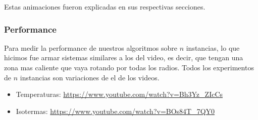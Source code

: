 Estas animaciones fueron explicadas en sus respectivas secciones. 

\subsubsection{Performance}

Para medir la performance de nuestros algoritmos sobre $n$ instancias, lo que hicimos fue armar sistemas similares a los del video, es decir, que tengan una zona mas caliente que vaya rotando por todas los radios. Todos los experimentos de $n$ instancias son variaciones de el de los videos.

\begin{itemize}
  \item Temperaturas: \url{https://www.youtube.com/watch?v=Bh3Yz_ZIcCs}
  \item Isotermas: \url{https://www.youtube.com/watch?v=BOs84T_7QY0}
\end{itemize}




\newpage
\nocite{*}
\printbibliography





